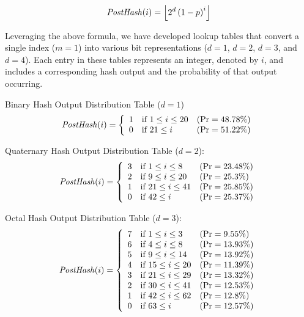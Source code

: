 \begin{equation}
    \text{\textit{PostHash}}(i) = \left\lfloor 2^d \left(1 - p\right)^i \right\rfloor
    \label{eq:GeomFormula}
\end{equation}
    
 
Leveraging the above formula, we have developed lookup tables that convert a single index (\(m = 1\)) into various bit representations (\(d=1\), \(d=2\), \(d=3\), and \(d=4\)). Each entry in these tables represents an integer, denoted by \(i\), and includes a corresponding hash output and the probability of that output occurring.

Binary Hash Output Distribution Table (\(d=1\))
{\renewcommand{\arraystretch}{1.25}
\[
\text{\textit{PostHash}}(i) = \left\{
    \begin{array}{lll}
        \text{1}  & \text{if } 1 \leq i \leq 20 & (\text{Pr} = 48.78\%)
        \\
        \text{0}  & \text{if } 21 \leq i & (\text{Pr} = 51.22\%)
        \\
    \end{array}
\right.    
\]}


Quaternary Hash Output Distribution Table (\(d=2\)):
{\renewcommand{\arraystretch}{1.25}
\[
\text{\textit{PostHash}}(i) = \left\{
    \begin{array}{lll}
        \text{3}  & \text{if } 1 \leq i \leq 8 & (\text{Pr} = 23.48\%)
        \\
        \text{2}  & \text{if } 9 \leq i \leq 20 & (\text{Pr} = 25.3\%)
        \\
        \text{1}  & \text{if } 21 \leq i \leq 41 & (\text{Pr} = 25.85\%)
        \\
        \text{0}  & \text{if } 42 \leq i & (\text{Pr} = 25.37\%)
        \\
    \end{array}
\right.    
\]}

Octal Hash Output Distribution Table (\(d=3\)):
{\renewcommand{\arraystretch}{1.25}
\[
\text{\textit{PostHash}}(i) = \left\{
    \begin{array}{lll}
        \text{7}  & \text{if } 1 \leq i \leq 3 & (\text{Pr} = 9.55\%)
        \\
        \text{6}  & \text{if } 4 \leq i \leq 8 & (\text{Pr} = 13.93\%)
        \\
        \text{5}  & \text{if } 9 \leq i \leq 14 & (\text{Pr} = 13.92\%)
        \\
        \text{4}  & \text{if } 15 \leq i \leq 20 & (\text{Pr} = 11.39\%)
        \\
        \text{3}  & \text{if } 21 \leq i \leq 29 & (\text{Pr} = 13.32\%)
        \\
        \text{2}  & \text{if } 30 \leq i \leq 41 & (\text{Pr} = 12.53\%)
        \\
        \text{1}  & \text{if } 42 \leq i \leq 62 & (\text{Pr} = 12.8\%)
        \\
        \text{0}  & \text{if } 63 \leq i & (\text{Pr} = 12.57\%)
        \\
    \end{array}
\right.    
\]}


